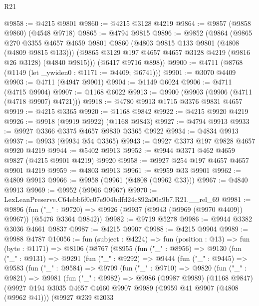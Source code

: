 \begin{lexlean}{R21}
\begin{coremodule}
@9858 := @4215 @9801
@9860 := @4215 @3128 @4219
@9864 := @9857 (@9858 @9860) (@4548 @9718)
@9865 := @4794 @9815
@9896 := @9852
    (@9864
      (@9865
        @270
        @3355
        @4657
        @4659
        @9801
        @9860
        (@4803 @9815 @133 @9801 (@4808 (@4809 @9815 @133)))
        (@9865 @3129 @197 @4657 @4657 @3128 @4219 (@9816 @26 @3128) (@4840 @9815)))
      (@6417 @9716 @898))
@9900 := @4711 (@8768 (@1149 (let _ywiden0 : @1171 := @4409; @6741)))
@9901 := @3070 @4409
@9903 := @4711 (@4947 @9901)
@9904 := @1149 @6024
@9906 := @4711 (@4715 @9904)
@9907 := @1168 @6022
@9913 := @9900 (@9903 (@9906 (@4711 (@4718 @9907) @4721)))
@9918 := @4780 @9913 @1715 @3376 @9831 @4657
@9919 := @4215 @3365
@9920 := @1168 @9842
@9922 := @4215 @9920 @4219
@9926 := @9918 (@9919 @9922) (@1168 @9843)
@9927 := @4794 @9913
@9933 := @9927 @3366 @3375 @4657 @9830 @3365 @9922
@9934 := @4834 @9913
@9937 := @9933 (@9934 @54 @3365)
@9943 := @9927 @3373 @197 @9828 @4657 @9920 @4219
@9944 := @5402 @9913
@9952 := @9944 @3371 @462 @4659 @9827 (@4215 @9901 @4219) @9920
@9958 := @9927 @254 @197 @4657 @4657 @9901 @4219
@9959 := @4803 @9913
@9961 := @9959 @33 @9901
@9962 := @4809 @9913
@9966 := @9958 (@9961 (@4808 (@9962 @33)))
@9967 := @4840 @9913
@9969 := @9952 (@9966 @9967)
@9970 := LexLeanPreserve.C64ebb6f0c07e904bdfd24c892a00a9b7.R21.__rel_69
@9981 := @9896
    (fun ("_" : @9720) => @9926 (@9937 (@9943 (@9969 (@9970 @4409)) @9967)) (@5476 @3364 @9842))
@9982 := @9719 @5278
@9986 := @9944 @3382 @3036 @4661 @9837
@9987 := @4215 @9907
@9988 := @4215 @9904
@9989 := @9988 @4787
@10056 := fun (subject : @4224) =>
  fun (position : @13) =>
  fun (byte : @1171) =>
  @8106
    (@8767
      (@8955
        (fun ("_" : @8956) =>
        @9130
          (fun ("_" : @9131) =>
          @9291
            (fun ("_" : @9292) =>
            @9444
              (fun ("_" : @9445) =>
              @9583
                (fun ("_" : @9584) =>
                @9709
                  (fun ("_" : @9710) =>
                  @9820
                    (fun ("_" : @9821) =>
                    @9981
                      (fun ("_" : @9982) =>
                      @9986
                        (@9987 @9989)
                        (@1168 @9847)
                        (@9927
                          @194
                          @3035
                          @4657
                          @4660
                          @9907
                          @9989
                          (@9959 @41 @9907 (@4808 (@9962 @41)))
                          (@9927
                            @239
                            @2033

\end{coremodule}
\end{lexlean}
